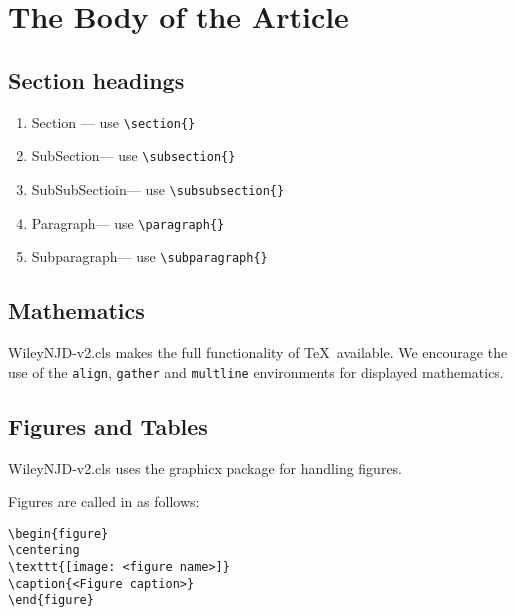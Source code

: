 \documentclass[AMS,STIX1COL]{WileyNJD-v2}
\begin{document}
\section{The Body of the Article}

\subsection{Section headings}

\begin{enumerate}[(H1)]
\item Section --- use \verb"\section{}"
\item SubSection--- use \verb"\subsection{}"
\item SubSubSectioin--- use \verb"\subsubsection{}"
\item Paragraph--- use \verb"\paragraph{}"
\item Subparagraph--- use \verb"\subparagraph{}"
\end{enumerate}

\subsection{Mathematics} \textsf{WileyNJD-v2.cls} makes the full
functionality of \AmS\/\TeX\ available. We encourage the use of
the \verb"align", \verb"gather" and \verb"multline" environments
for displayed mathematics.

\subsection{Figures and Tables}

\textsf{WileyNJD-v2.cls} uses the
\textsf{graphicx} package for handling figures.

Figures are called in as follows:
\begin{verbatim}
\begin{figure}
\centering
\texttt{[image: <figure name>]}
\caption{<Figure caption>}
\end{figure}
\end{verbatim}
\end{document}
